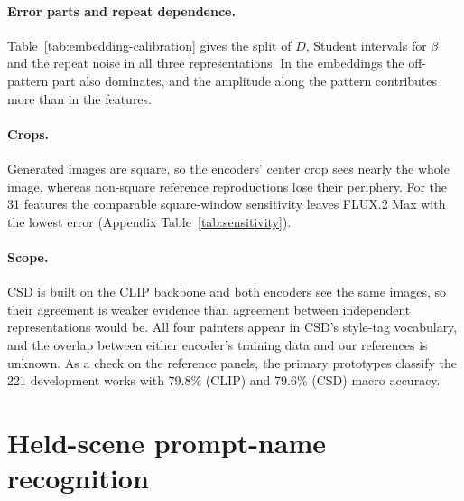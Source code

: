 





\paragraph{Error parts and repeat dependence.} Table~\ref{tab:embedding-calibration} gives the split
of $D$, Student intervals for $\beta$ and the repeat noise in all three representations. In the
embeddings the off-pattern part also dominates, and the amplitude along the pattern contributes
more than in the features.

\paragraph{Crops.} Generated images are square, so the encoders' center crop sees nearly the whole
image, whereas non-square reference reproductions lose their periphery. For the 31 features the
comparable square-window sensitivity leaves FLUX.2 Max with the lowest error (Appendix
Table~\ref{tab:sensitivity}).

\paragraph{Scope.} CSD is built on the CLIP backbone and both encoders see the same images, so
their agreement is weaker evidence than agreement between independent representations would be. All
four painters appear in CSD's style-tag vocabulary, and the overlap between either encoder's
training data and our references is unknown. As a check on the reference panels, the primary
prototypes classify the 221 development works with 79.8\% (CLIP) and 79.6\% (CSD) macro
accuracy.

\FloatBarrier
\section{Held-scene prompt-name recognition}\label{app:transfer}



